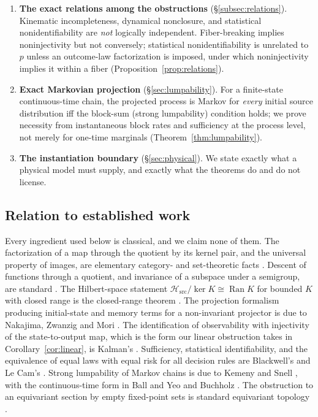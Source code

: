 \documentclass[11pt,reqno]{amsart}
\theoremstyle{plain}
\theoremstyle{definition}
\theoremstyle{remark}
\DeclareMathOperator{\Ran}{Ran}
\newcommand{\Hsrc}{\mathcal{H}_{\mathrm{src}}}
\begin{document}
\begin{enumerate}
\item \textbf{The exact relations among the obstructions} (\S\ref{subsec:relations}). Kinematic incompleteness, dynamical nonclosure, and statistical nonidentifiability are \emph{not} logically independent. Fiber-breaking implies noninjectivity but not conversely; statistical nonidentifiability is unrelated to $p$ unless an outcome-law factorization is imposed, under which noninjectivity implies it within a fiber (Proposition~\ref{prop:relations}).

\item \textbf{Exact Markovian projection} (\S\ref{sec:lumpability}). For a finite-state continuous-time chain, the projected process is Markov for \emph{every} initial source distribution iff the block-sum (strong lumpability) condition holds; we prove necessity from instantaneous block rates and sufficiency at the process level, not merely for one-time marginals (Theorem~\ref{thm:lumpability}).

\item \textbf{The instantiation boundary} (\S\ref{sec:physical}). We state exactly what a physical model must supply, and exactly what the theorems do and do not license.
\end{enumerate}

\subsection{Relation to established work}

Every ingredient used below is classical, and we claim none of them. The factorization of a map through the quotient by its kernel pair, and the universal property of images, are elementary category- and set-theoretic facts \cite{MacLane}. Descent of functions through a quotient, and invariance of a subspace under a semigroup, are standard \cite{EngelNagel}. The Hilbert-space statement $\Hsrc/\ker K\cong\Ran K$ for bounded $K$ with closed range is the closed-range theorem \cite{Yosida}. The projection formalism producing initial-state and memory terms for a non-invariant projector is due to Nakajima, Zwanzig and Mori \cite{Nakajima1958,Zwanzig1960,Mori1965}. The identification of observability with injectivity of the state-to-output map, which is the form our linear obstruction takes in Corollary~\ref{cor:linear}, is Kalman's \cite{Kalman1963}. Sufficiency, statistical identifiability, and the equivalence of equal laws with equal risk for all decision rules are Blackwell's and Le Cam's \cite{Blackwell1951,LeCam1964,Lehmann}. Strong lumpability of Markov chains is due to Kemeny and Snell \cite{KemenySnell}, with the continuous-time form in Ball and Yeo \cite{BallYeo1993} and Buchholz \cite{Buchholz1994}. The obstruction to an equivariant section by empty fixed-point sets is standard equivariant topology \cite{tomDieck}.
\end{document}
